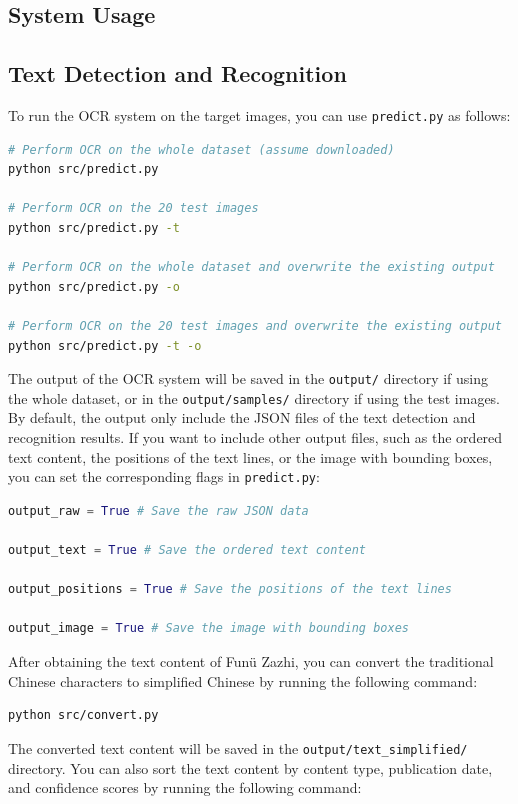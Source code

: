 \documentclass[12pt,twoside]{report}
\begin{document}
\begin{appendices}
\section{System Usage}
\label{sec:system_usage}
\subsection{Text Detection and Recognition}
To run the OCR system on the target images, you can use \texttt{predict.py} as follows:

\begin{lstlisting}[language=bash]
# Perform OCR on the whole dataset (assume downloaded)
python src/predict.py

# Perform OCR on the 20 test images
python src/predict.py -t

# Perform OCR on the whole dataset and overwrite the existing output
python src/predict.py -o

# Perform OCR on the 20 test images and overwrite the existing output
python src/predict.py -t -o
\end{lstlisting}

The output of the OCR system will be saved in the \texttt{output/} directory if using the whole dataset, or in the \texttt{output/samples/} directory if using the test images. By default, the output only include the JSON files of the text detection and recognition results. If you want to include other output files, such as the ordered text content, the positions of the text lines, or the image with bounding boxes, you can set the corresponding flags in \texttt{predict.py}:

\begin{lstlisting}[language=python]
output_raw = True # Save the raw JSON data

output_text = True # Save the ordered text content

output_positions = True # Save the positions of the text lines

output_image = True # Save the image with bounding boxes
\end{lstlisting}

After obtaining the text content of Funü Zazhi, you can convert the traditional Chinese characters to simplified Chinese by running the following command:

\begin{lstlisting}[language=bash]
python src/convert.py
\end{lstlisting}

The converted text content will be saved in the \texttt{output/text\_simplified/} directory. You can also sort the text content by content type, publication date, and confidence scores by running the following command:


\end{appendices}
\end{document}
